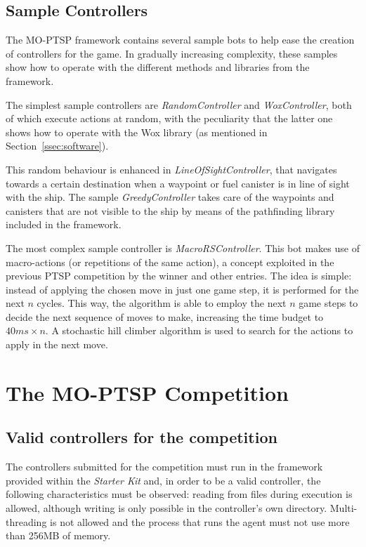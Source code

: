 \documentclass[conference]{IEEEtran}
\begin{document}
\subsection{Sample Controllers} \label{ssec:sample} 

The MO-PTSP framework contains several sample bots to help ease the creation of controllers for the game. In gradually increasing complexity, these samples show how to operate with the different methods and libraries from the framework.

The simplest sample controllers are \textit{RandomController} and \textit{WoxController}, both of which execute actions at random, with the peculiarity that the latter one shows how to operate with the Wox library (as mentioned in Section~\ref{ssec:software}).

This random behaviour is enhanced in \textit{LineOfSightController}, that navigates towards a certain destination when a waypoint or fuel canister is in line of sight with the ship. The sample \textit{GreedyController} takes care of the waypoints and canisters that are not visible to the ship by means of the pathfinding library included in the framework.

The most complex sample controller is \textit{MacroRSController}. This bot makes use of macro-actions (or repetitions of the same action), a concept exploited in the previous PTSP competition by the winner and other entries. The idea is simple: instead of applying the chosen move in just one game step, it is performed for the next $n$ cycles. This way, the algorithm is able to employ the next $n$ game steps to decide the next sequence of moves to make, increasing the time budget to $40ms \times n$. A stochastic hill climber algorithm is used to search for the actions to apply in the next move.

\section{The MO-PTSP Competition} \label{sec:comp}

\subsection{Valid controllers for the competition}

The controllers submitted for the competition must run in the framework provided within the \textit{Starter Kit} and, in order to be a valid controller, the following characteristics must be observed: reading from files during execution is allowed, although writing is only possible in the controller's own directory. Multi-threading is not allowed and the process that runs the agent must not use more than 256MB of memory.
\end{document}
